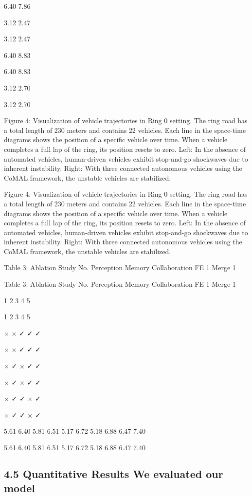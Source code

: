\documentclass[12pt]{article}
\begin{document}
6.40
7.86


3.12
2.47


3.12
2.47


6.40
8.83


6.40
8.83


3.12
2.70


3.12
2.70


Figure 4: Visualization of vehicle trajectories in Ring 0 setting. The ring road has a total length of 230 meters
and contains 22 vehicles. Each line in the space-time diagrams shows the position of a specific vehicle over time.
When a vehicle completes a full lap of the ring, its position resets to zero. Left: In the absence of automated
vehicles, human-driven vehicles exhibit stop-and-go shockwaves due to inherent instability. Right: With three
connected autonomous vehicles using the CoMAL framework, the unstable vehicles are stabilized.


Figure 4: Visualization of vehicle trajectories in Ring 0 setting. The ring road has a total length of 230 meters
and contains 22 vehicles. Each line in the space-time diagrams shows the position of a specific vehicle over time.
When a vehicle completes a full lap of the ring, its position resets to zero. Left: In the absence of automated
vehicles, human-driven vehicles exhibit stop-and-go shockwaves due to inherent instability. Right: With three
connected autonomous vehicles using the CoMAL framework, the unstable vehicles are stabilized.


Table 3: Ablation Study
No. Perception Memory Collaboration FE 1 Merge 1


Table 3: Ablation Study
No. Perception Memory Collaboration FE 1 Merge 1


1
2
3
4
5


1
2
3
4
5


×
×
✓
✓
✓


×
×
✓
✓
✓


×
✓
×
✓
✓


×
✓
×
✓
✓


×
✓
✓
×
✓


×
✓
✓
×
✓


5.61 6.40
5.81 6.51
5.17 6.72
5.18 6.88
6.47 7.40


5.61 6.40
5.81 6.51
5.17 6.72
5.18 6.88
6.47 7.40


\subsection{4.5 Quantitative Results We evaluated our model}
\end{document}
